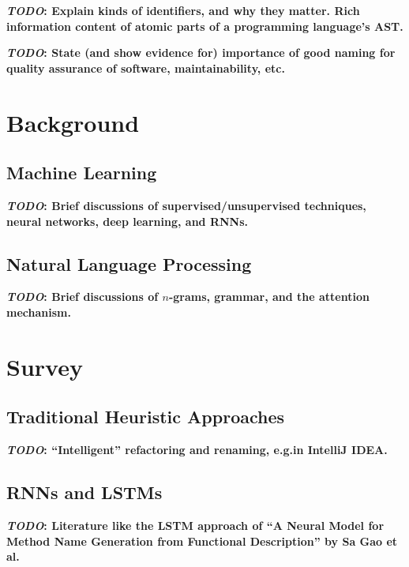 \documentclass[conference]{IEEEtran}
\newcommand{\TODO}[1]{\textbf{\textcolor{Bittersweet}{#1}}\xspace}
\newcommand{\TODOM}[1]{\TODO{\emph{TODO}: #1}\xspace}
\begin{document}
\TODOM{Explain kinds of identifiers, and why they matter. Rich information content of
atomic parts of a programming language's AST.}

\TODOM{State (and show evidence for) importance of good naming for quality assurance of
software, maintainability, etc.}


\section{Background}
\label{sec:Background}

\subsection{Machine Learning}
\label{ssec:Machine-Learning}

\TODOM{Brief discussions of supervised/unsupervised techniques, neural networks, deep
learning, and RNNs.}


\subsection{Natural Language Processing}
\label{ssec:Natural-Language-Processing}

\TODOM{Brief discussions of $n$-grams, grammar, and the attention mechanism.}


\section{Survey}
\label{sec:Survey}

\subsection{Traditional Heuristic Approaches}
\label{ssec:Traditional-Heuristic-Approaches}
\TODOM{``Intelligent'' refactoring and renaming, e.g.\@ in IntelliJ IDEA.}

\subsection{RNNs and LSTMs}
\label{ssec:RNNs and LSTMs}
\TODOM{Literature like the LSTM approach of ``A Neural Model for Method Name Generation
from Functional Description'' by Sa Gao et al.\cite{Gao2019IdentGen}}
\end{document}
